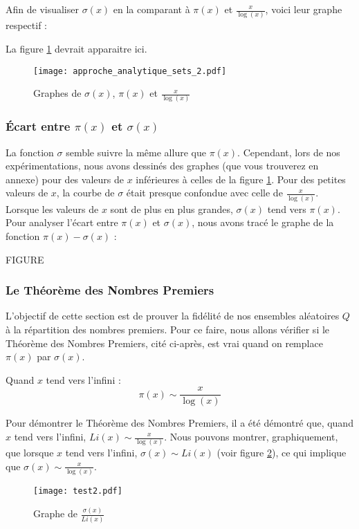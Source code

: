 \documentclass[../main.tex]{report}
\begin{document}
Afin de visualiser  $\sigma(x)$ en la comparant à $\pi(x)$ et $\frac{x}{\log(x)}$, voici leur graphe respectif : 

\hspace{1cm}

La figure \ref{im:image1} devrait apparaitre ici.
\begin{figure}[htbp]
	\centerline{\texttt{[image: approche\_analytique\_sets\_2.pdf]}}
\caption{Graphes de $\sigma(x)$, $\pi(x)$ et $\frac{x}{\log(x)}$ }
	\label{im:image1}
\end{figure}

\subsubsection{Écart entre $\pi(x)$ et $\sigma(x)$}

La fonction $\sigma$ semble suivre la même allure que $\pi(x)$. Cependant, lors de nos expérimentations, nous avons
dessinés des graphes (que vous trouverez en annexe) pour des valeurs de $x$ inférieures à celles de la figure \ref{im:image1}. Pour des petites valeurs de $x$, la courbe de $\sigma$ était presque confondue avec celle de $\frac{x}{\log(x)}$. Lorsque les valeurs de $x$ sont de plus en plus grandes, $\sigma(x)$ tend vers $\pi(x)$. Pour analyser l'écart entre $\pi(x)$ et $\sigma(x)$, nous avons tracé le graphe de la fonction $\pi(x) - \sigma(x)$ : 

\hspace{1cm}

FIGURE

\subsubsection{Le Théorème des Nombres Premiers}

L'objectif de cette section est de prouver la fidélité de nos ensembles aléatoires $Q$ à la répartition des nombres premiers.
Pour ce faire, nous allons vérifier si le Théorème des Nombres Premiers, cité ci-après, est vrai quand on remplace $\pi(x)$ par $\sigma(x)$. 

\begin{Thm}
\label{TNP}
	Quand $x$ tend vers l'infini : 
	\[ \pi(x) \sim \frac{x}{\log(x)}  \]
\end{Thm}

Pour démontrer le Théorème des Nombres Premiers, il a été démontré que, quand $x$ tend vers l'infini, $ Li(x) \sim \frac{x}{\log(x)} $. Nous pouvons montrer, graphiquement, que lorsque $x$ tend vers l'infini, $ \sigma(x) \sim Li(x) $ (voir figure \ref{im:image3}), ce qui implique que $ \sigma(x) \sim \frac{x}{\log(x)} $.
\begin{figure}[htbp]
	\centerline{\texttt{[image: test2.pdf]}}
\caption{Graphe de $\frac{\sigma(x)}{Li(x)}$ }
	\label{im:image3}
\end{figure}
\end{document}

